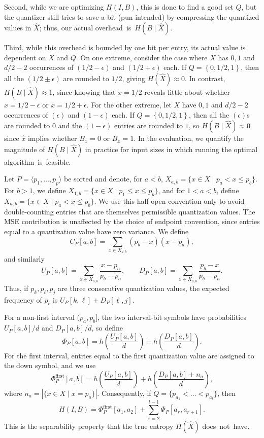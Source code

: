 \documentclass[11pt,letterpaper]{article}
\newcommand{\set}[1]{\left\{#1\right\}}
\begin{document}
{Second, while we are optimizing $H(I,B)$, this is done to find a good set $Q$, but the quantizer still tries to save a bit (pun intended) by compressing the quantized values in $\widehat X$; thus, our actual \mbox{overhead is $H(B\mid \widehat X)$.}

Third, while this overhead is bounded by one bit per entry, its actual value is dependent on $X$ and $Q$. On one extreme, consider the case where $X$ has $0,1$ and $d/2-2$ occurrences of $(1/2-\epsilon)$ and $(1/2+\epsilon)$ each. If $Q=\set{0,1/2,1}$, then all the $(1/2\pm\epsilon)$ are rounded to $1/2$, giving $H(\widehat X)\approx 0$. In contrast, $H(B\mid \widehat X)\approx 1$, since knowing that $\widehat x=1/2$ reveals little about whether $x=1/2-\epsilon$ or $x=1/2+\epsilon$. For the other extreme, let $X$ have $0,1$ and $d/2-2$ occurrences of $(\epsilon)$ and $(1-\epsilon)$ each. If $Q=\set{0,1/2,1}$, then all the $(\epsilon)$s are rounded to $0$ and the $(1-\epsilon)$ entries are rounded to $1$, so $H(B\mid \widehat X)\approx 0$ since $\widehat x$ implies whether $B_x=0$ or $B_x=1$.
In the evaluation, we quantify the magnitude of $H(B\mid \widehat X)$ in practice for input sizes in which running the optimal \mbox{algorithm is feasible.}





Let $P=\langle p_1,\ldots,p_p\rangle$ be sorted and denote, for $a<b$, $X_{a,b}=\{x\in X\mid p_a<x\le p_b\}$. 
%
For $b>1$, we define $X_{1,b}=\{x\in X \mid p_1 \le x \le p_b\}$, and for
$1<a<b$, define $X_{a,b}=\{x\in X \mid p_a < x \le p_b\}$. We use this
half-open convention only to avoid double-counting entries that are themselves
permissible quantization values. The MSE contribution is unaffected by the
choice of endpoint convention, since entries equal to a quantization value have
zero variance. We define
\[
C_P[a,b] =
\sum_{x\in X_{a,b}} (p_b-x)(x-p_a),
\]
and similarly
{\small
\[
U_P[a,b]=\sum_{x\in X_{a,b}} \frac{x-p_a}{p_b-p_a},
\qquad
D_P[a,b]=\sum_{x\in X_{a,b}} \frac{p_b-x}{p_b-p_a}.
\]
}
Thus, if $p_k,p_\ell,p_j$ are three consecutive quantization values, the
expected frequency of $p_\ell$ is
$
U_P[k,\ell] + D_P[\ell,j].
$

For a non-first interval $(p_a,p_b]$, the two interval-bit symbols have probabilities $U_P[a,b]/d$ and $D_P[a,b]/d$, so define
\[
    \Phi_P[a,b]
    =h\!\left(\frac{U_P[a,b]}{d}\right)
    +h\!\left(\frac{D_P[a,b]}{d}\right).
\]
For the first interval, entries equal to the first quantization value are assigned to the down symbol, and we use
\[
    \Phi^{\mathrm{first}}_P[a,b]
    =h\!\left(\frac{U_P[a,b]}{d}\right)
    +h\!\left(\frac{D_P[a,b]+n_a}{d}\right),
\]
where $n_a=|\{x\in X\mid x=p_a\}|$.
Consequently, if $Q=\{p_{a_1}<\ldots<p_{a_t}\}$, then
\begin{equation}
    H(I,B)
    =\Phi^{\mathrm{first}}_P[a_1,a_2]
    +\sum_{r=2}^{t-1}\Phi_P[a_r,a_{r+1}] .    \label{eq:apx_additive_entropy}
\end{equation}
This is the separability property that the true entropy $H(\widehat X)$ \mbox{does not have.}

}
\end{document}
